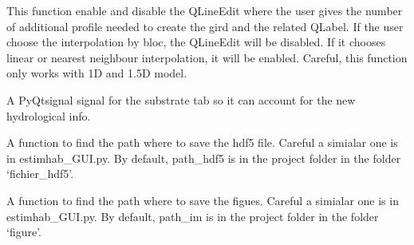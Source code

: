 \documentclass[letterpaper,10pt,english]{sphinxmanual}
\begin{document}
\begin{fulllineitems}
\begin{fulllineitems}
\begin{quote}
\begin{description}
\end{description}\end{quote}

\end{fulllineitems}


\begin{fulllineitems}
\label{\detokenize{index:src_GUI.hydro_GUI_2.SubHydroW.dis_enable_nb_profile}}
This function enable and disable the QLineEdit where the user gives the number of additional profile needed to
create the gird and the related QLabel. If the user choose the interpolation by bloc, the QLineEdit will be
disabled. If it chooses linear or nearest neighbour interpolation, it will be enabled. Careful, this function
only works with 1D and 1.5D model.

\end{fulllineitems}


\begin{fulllineitems}
\label{\detokenize{index:src_GUI.hydro_GUI_2.SubHydroW.drop_hydro}}
A PyQtsignal signal for the substrate tab so it can account for the new hydrological info.

\end{fulllineitems}


\begin{fulllineitems}
\label{\detokenize{index:src_GUI.hydro_GUI_2.SubHydroW.find_path_hdf5}}
A function to find the path where to save the hdf5 file. Careful a simialar one is in estimhab\_GUI.py. By default,
path\_hdf5 is in the project folder in the folder `fichier\_hdf5'.

\end{fulllineitems}


\begin{fulllineitems}
\label{\detokenize{index:src_GUI.hydro_GUI_2.SubHydroW.find_path_im}}
A function to find the path where to save the figues. Careful a simialar one is in estimhab\_GUI.py. By default,
path\_im is in the project folder in the folder `figure'.


\end{fulllineitems}
\end{fulllineitems}
\end{document}
